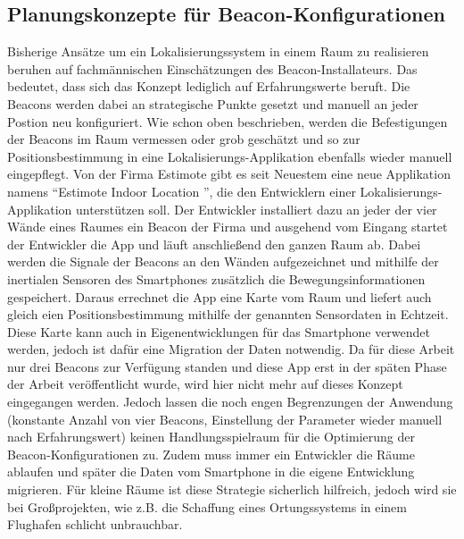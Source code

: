 \subsection{Planungskonzepte für Beacon-Konfigurationen}
Bisherige Ansätze um ein Lokalisierungssystem in einem Raum zu realisieren beruhen auf fachmännischen Einschätzungen des Beacon-Installateurs. Das bedeutet, dass sich das Konzept lediglich auf Erfahrungswerte beruft. Die Beacons werden dabei an strategische Punkte gesetzt und manuell an jeder Postion neu konfiguriert. Wie schon oben beschrieben, werden die Befestigungen der Beacons im Raum vermessen oder grob geschätzt und so zur Positionsbestimmung in eine Lokalisierungs-Applikation ebenfalls wieder manuell eingepflegt. Von der Firma Estimote gibt es seit Neuestem eine neue Applikation namens "`Estimote Indoor Location "', die den Entwicklern einer Lokalisierungs-Applikation unterstützen soll. Der Entwickler installiert dazu an jeder der vier Wände eines Raumes ein Beacon der Firma und ausgehend vom Eingang startet der Entwickler die App und läuft anschließend den ganzen Raum ab. Dabei werden die Signale der Beacons an den Wänden aufgezeichnet und mithilfe der inertialen Sensoren des Smartphones zusätzlich die Bewegungsinformationen gespeichert. Daraus errechnet die App eine Karte vom Raum und liefert auch gleich eien Positionsbestimmung mithilfe der genannten Sensordaten in Echtzeit. Diese Karte kann auch in Eigenentwicklungen für das Smartphone verwendet werden, jedoch ist dafür eine Migration der Daten notwendig. Da für diese Arbeit nur drei Beacons zur Verfügung standen und diese App erst in der späten Phase der Arbeit veröffentlicht wurde, wird hier nicht mehr auf dieses Konzept eingegangen werden. Jedoch lassen die noch engen Begrenzungen der Anwendung (konstante Anzahl von vier Beacons, Einstellung der Parameter wieder manuell nach Erfahrungswert) keinen Handlungsspielraum für die Optimierung der Beacon-Konfigurationen zu. Zudem muss immer ein Entwickler die Räume ablaufen und später die Daten vom Smartphone in die eigene Entwicklung migrieren. Für kleine Räume ist diese Strategie sicherlich hilfreich, jedoch wird sie bei Großprojekten, wie z.B. die Schaffung eines Ortungssystems in einem Flughafen schlicht unbrauchbar.
